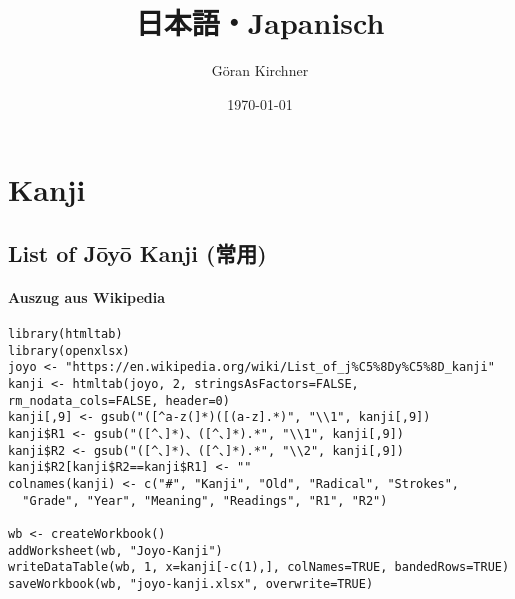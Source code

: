 \documentclass[justified, a4paper, notitlepage, captions=tableheading, nobib]{tufte-handout}
\author{Göran Kirchner}
\date{\today}
\title{日本語・Japanisch}
\newcommand{\textls}[2][5]{%
\begingroup\addfontfeatures{LetterSpace=#1}#2\endgroup
}
\renewcommand{\allcapsspacing}[1]{\textls[15]{#1}}
\renewcommand{\smallcapsspacing}[1]{\textls[10]{#1}}
\renewcommand{\allcaps}[1]{\textls[15]{\MakeTextUppercase{#1}}}
\renewcommand{\smallcaps}[1]{\smallcapsspacing{\scshape\MakeTextLowercase{#1}}}
\renewcommand{\textsc}[1]{\smallcapsspacing{\textsmallcaps{#1}}}
\begin{document}
\maketitle
\ifxetex
  \newcommand{\textls}[2][5]{%
    \begingroup\addfontfeatures{LetterSpace=#1}#2\endgroup
  }
  \renewcommand{\allcapsspacing}[1]{\textls[15]{#1}}
  \renewcommand{\smallcapsspacing}[1]{\textls[10]{#1}}
  \renewcommand{\allcaps}[1]{\textls[15]{\MakeTextUppercase{#1}}}
  \renewcommand{\smallcaps}[1]{\smallcapsspacing{\scshape\MakeTextLowercase{#1}}}
  \renewcommand{\textsc}[1]{\smallcapsspacing{\textsmallcaps{#1}}}
\fi

\newpage
\section{Kanji }
\label{sec:org15d301a}

\subsection{List of Jōyō Kanji (常用) }
\label{sec:org1bc78d5}
\paragraph{Auszug aus Wikipedia}
\label{sec:org1512512}
\begin{verbatim}
library(htmltab)
library(openxlsx)
joyo <- "https://en.wikipedia.org/wiki/List_of_j%C5%8Dy%C5%8D_kanji"
kanji <- htmltab(joyo, 2, stringsAsFactors=FALSE, rm_nodata_cols=FALSE, header=0)
kanji[,9] <- gsub("([^a-z(]*)([(a-z].*)", "\\1", kanji[,9])
kanji$R1 <- gsub("([^、]*)、([^、]*).*", "\\1", kanji[,9])
kanji$R2 <- gsub("([^、]*)、([^、]*).*", "\\2", kanji[,9])
kanji$R2[kanji$R2==kanji$R1] <- ""
colnames(kanji) <- c("#", "Kanji", "Old", "Radical", "Strokes", 
  "Grade", "Year", "Meaning", "Readings", "R1", "R2")

wb <- createWorkbook()
addWorksheet(wb, "Joyo-Kanji")
writeDataTable(wb, 1, x=kanji[-c(1),], colNames=TRUE, bandedRows=TRUE)
saveWorkbook(wb, "joyo-kanji.xlsx", overwrite=TRUE)
\end{verbatim}
\end{document}

